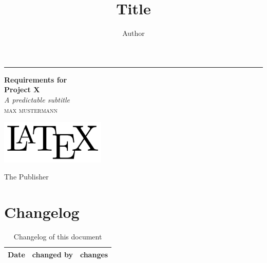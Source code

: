 \documentclass[a4paper, 12pt,twoside]{article}
\title{Title}
\author{Author}
\newcommand*{\plogo}{\fbox{$\mathcal{PL}$}}
\newcommand*{\pname}{Project X}
\begin{document}
\begin{titlepage} %
	
	\raggedleft %
	
	\rule{1pt}{\textheight} %
	\hspace{0.05\textwidth} %
	\parbox[b]{0.75\textwidth}{ %
		
		{\Huge\bfseries Requirements for \\[0.5\baselineskip] \pname}\\[2\baselineskip] %
		{\large\textit{A predictable subtitle}}\\[4\baselineskip] %
		{\Large\textsc{max mustermann}}\\[4\baselineskip] %
		{
				\includegraphics[width=5cm]{images/2000px-LaTeX_logo.png}

		}			
		\vspace{0.4\textheight} %
		
		{\noindent The Publisher~~\plogo}\\[\baselineskip] %
	}
	
\end{titlepage}

\tableofcontents
\newpage

\begin{abstract}

\end{abstract}

\newpage
\section*{Changelog}
\begin{table}[t!h]
	\centering
	\begin{tabular}{|c|l|l|}
		\hline
		\textbf{Date} & \textbf{changed by} & \textbf{changes}\\\hline
	\end{tabular}
	\caption{Changelog of this document}
	\label{tab:changelog}
\end{table}
\end{document}
